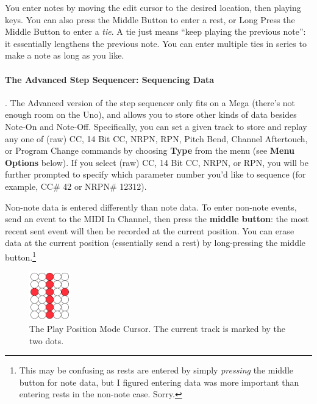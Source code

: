 \documentclass{article}
\begin{document}
You enter notes by moving the edit cursor to the desired location, then playing keys.  You can also press the Middle Button to enter a rest, or Long Press the Middle Button to enter a {\it tie}.  A tie just means ``keep playing the previous note'': it essentially lengthens the previous note.  You can enter multiple ties in series to make a note as long as you like.

\paragraph{The Advanced Step Sequencer: Sequencing Data}.  The Advanced version of the step sequencer only fits on a Mega (there's not enough room on the Uno), and allows you to store other kinds of data besides Note-On and Note-Off.  Specifically, you can set a given track to store and replay any one of (raw) CC, 14 Bit CC, NRPN, RPN, Pitch Bend, Channel Aftertouch, or Program Change commands by choosing {\bf Type} from the menu (see {\bf Menu Options} below).  If you select (raw) CC, 14 Bit CC, NRPN, or RPN, you will be further prompted to specify which parameter number you'd like to sequence (for example, CC\# 42 or NRPN\# 12312).

Non-note data is entered differently than note data.  To enter non-note events, send an event to the MIDI In Channel, then press the {\bf middle button}: the most recent sent event will then be recorded at the current position.  You can erase data at the current position (essentially send a rest) by long-pressing the middle button.\footnote{This may be confusing as rests are entered by simply {\it pressing} the middle button for note data, but I figured entering data was more important than entering rests in the non-note case.  Sorry.}

\begin{figure}
\vspace{-1em}\hspace{\fill}\includegraphics[width=0.7in]{playpositionmode}\hspace{\fill}%
\vspace{-1em}
\caption{\small The Play Position Mode Cursor.  The current track is marked by the two dots.}
\vspace{-1em}
\label{playpositionmode}
\end{figure}
\end{document}
